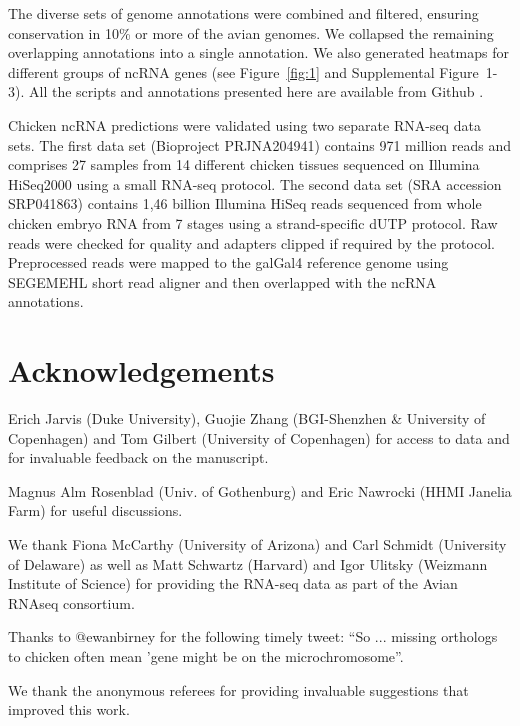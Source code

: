 \documentclass[10pt]{bmc_article}
\newcommand {\ppg}[1]{\textcolor{blue}{#1}}
\newenvironment{bmcformat}{\begin{raggedright}\baselineskip20pt\sloppy\setboolean{publ}{false}}{\end{raggedright}\baselineskip20pt\sloppy}
\begin{document}
\begin{bmcformat}

The diverse sets of genome annotations were combined and filtered,
ensuring conservation in 10\% or more of the avian genomes. We
collapsed the remaining overlapping annotations into a single
annotation. We also generated heatmaps for different groups of ncRNA
genes (see Figure~\ref{fig:1} and Supplemental Figure~1-3). All the
scripts and annotations presented here are available from Github
\cite{gitrepo}.

Chicken ncRNA predictions were validated using two separate RNA-seq
data sets. The first data set (Bioproject PRJNA204941) contains 971
million reads and comprises 27 samples from 14 different chicken
tissues sequenced on Illumina HiSeq2000 using a small RNA-seq
protocol. The second data set (SRA accession SRP041863) contains 1,46
billion Illumina HiSeq reads sequenced from whole chicken embryo RNA
from 7 stages using a strand-specific dUTP protocol. Raw reads were
checked for quality and adapters clipped if required by the
protocol. Preprocessed reads were mapped to the galGal4 reference
genome using SEGEMEHL short read aligner \cite{segemehl} and then
overlapped with the ncRNA annotations.


\section*{Acknowledgements}

Erich Jarvis (Duke University), Guojie Zhang (BGI-Shenzhen \&
University of Copenhagen) and Tom Gilbert (University of Copenhagen)
for access to data and for invaluable feedback on the manuscript.

Magnus Alm Rosenblad (Univ. of Gothenburg) and Eric Nawrocki (HHMI
Janelia Farm) for useful discussions.

We thank Fiona McCarthy (University of Arizona) and Carl
Schmidt (University of Delaware) as well as Matt Schwartz (Harvard)
and Igor Ulitsky (Weizmann Institute of Science) for providing the
RNA-seq data as part of the Avian RNAseq consortium.

Thanks to @ewanbirney for the following timely tweet: ``So ... missing
orthologs to chicken often mean 'gene might be on the
microchromosome''.


We thank the anonymous referees for providing invaluable suggestions
that improved this work. 




\end{bmcformat}
\end{document}
